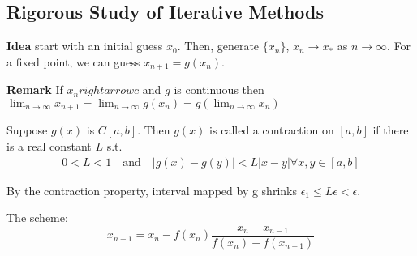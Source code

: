 \subsection{Rigorous Study of Iterative Methods}

\textbf{Idea} start with an initial guess $x_0$. Then, generate $\{x_n\}$, $x_n\rightarrow x_*$ as $n\rightarrow \infty$. For a fixed point, we can guess $x_{n+1}=g(x_n)$.

\textbf{Remark} If $x_n rightarrow c$ and $g$ is continuous then $\lim_{n\rightarrow \infty}x_{n+1} = \lim_{n\rightarrow \infty}g(x_n) = g(\lim_{n\rightarrow \infty}x_n)$


\begin{definition} 
    Suppose $g(x)$ is $C[a,b]$. Then $g(x)$ is called a contraction on $[a,b]$ if there is a real constant $L$ s.t.
    \begin{align*} 
        0<L<1 \quad \mathrm{and} \quad |g(x)-g(y)|< L |x-y| \forall x,y\in[a,b]
    \end{align*}
\end{definition}

\begin{remark} 
 By the contraction property, interval mapped by g shrinks $\epsilon_1 \leq L\epsilon < \epsilon$.
\end{remark}




\begin{definition} 
    The scheme:
    \begin{equation} 
        x_{n+1} = x_n - f(x_n)\frac{x_n - x_{n-1}}{f(x_n)-f(x_{n-1})}
    \end{equation}
\end{definition}

